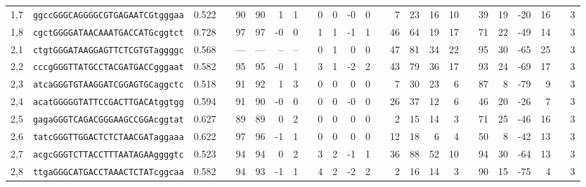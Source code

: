 \begin{tabular}{rlrcrrrrcrrrrcrrrrcrrrrcr}
1,7 &
 \texttt{ggccGGGCAGGGGCGTGAGAATCGtgggaa} &
 0.522 &
 &
 90 &
  90 &
  1 &
  1 &
  &
 0 &
  0 &
  -0 &
  0 &
  &
 7 &
  23 &
  16 &
  10 &
  &
 39 &
  19 &
  -20 &
  16 &
  &
 3 \\

1,8 &
 \texttt{cgctGGGGATAACAAATGACCATGcggtct} &
 0.728 &
 &
 97 &
  97 &
  -0 &
  0 &
  &
 1 &
  1 &
  -1 &
  1 &
  &
 46 &
  64 &
  19 &
  17 &
  &
 71 &
  22 &
  -49 &
  14 &
  &
 3 \\

2,1 &
 \texttt{ctgtGGGATAAGGAGTTCTCGTGTaggggc} &
 0.568 &
 &
 --- &
  --- &
  -- &
  -- &
  &
 0 &
  1 &
  0 &
  0 &
  &
 47 &
  81 &
  34 &
  22 &
  &
 95 &
  30 &
  -65 &
  25 &
  &
 3 \\

2,2 &
 \texttt{cccgGGGTTATGCCTACGATGACCgggaat} &
 0.582 &
 &
 95 &
  95 &
  -0 &
  1 &
  &
 3 &
  1 &
  -2 &
  2 &
  &
 43 &
  79 &
  36 &
  17 &
  &
 93 &
  24 &
  -69 &
  17 &
  &
 3 \\

2,3 &
 \texttt{atcaGGGTGTAAGGATCGGAGTGCaggctc} &
 0.518 &
 &
 91 &
  92 &
  1 &
  3 &
  &
 0 &
  0 &
  0 &
  0 &
  &
 7 &
  30 &
  23 &
  6 &
  &
 87 &
  8 &
  -79 &
  9 &
  &
 3 \\

2,4 &
 \texttt{acatGGGGGTATTCCGACTTGACAtggtgg} &
 0.594 &
 &
 91 &
  90 &
  -0 &
  0 &
  &
 0 &
  0 &
  -0 &
  0 &
  &
 26 &
  37 &
  12 &
  6 &
  &
 46 &
  20 &
  -26 &
  7 &
  &
 3 \\

2,5 &
 \texttt{gagaGGGTCAGACGGGAAGCCGGAcggtat} &
 0.627 &
 &
 89 &
  89 &
  0 &
  2 &
  &
 0 &
  0 &
  0 &
  0 &
  &
 2 &
  15 &
  14 &
  3 &
  &
 71 &
  25 &
  -46 &
  16 &
  &
 3 \\

2,6 &
 \texttt{tatcGGGTTGGACTCTCTAACGATaggaaa} &
 0.622 &
 &
 97 &
  96 &
  -1 &
  1 &
  &
 0 &
  0 &
  0 &
  0 &
  &
 12 &
  18 &
  6 &
  4 &
  &
 50 &
  8 &
  -42 &
  13 &
  &
 3 \\

2,7 &
 \texttt{acgcGGGTCTTACCTTTAATAGAAggggtc} &
 0.523 &
 &
 94 &
  94 &
  0 &
  2 &
  &
 3 &
  2 &
  -1 &
  1 &
  &
 36 &
  88 &
  52 &
  10 &
  &
 94 &
  30 &
  -64 &
  13 &
  &
 3 \\

2,8 &
 \texttt{ttgaGGGCATGACCTAAACTCTATcggcaa} &
 0.582 &
 &
 94 &
  93 &
  -1 &
  1 &
  &
 4 &
  2 &
  -2 &
  2 &
  &
 2 &
  16 &
  14 &
  3 &
  &
 90 &
  15 &
  -75 &
  4 &
  &
 3 \\


\end{tabular}
